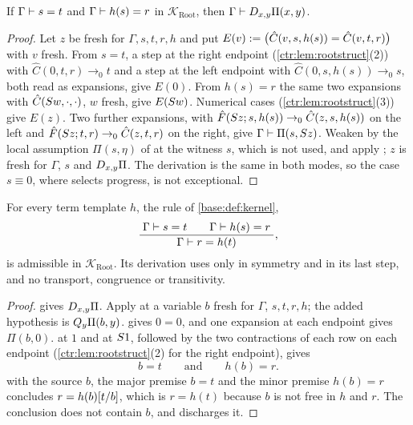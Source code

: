 \begin{lemma}\label{ctr:lem:rootpacket}
If $\Gamma\vdash s=t$ and $\Gamma\vdash h(s)=r$ in $\mathcal K_{\mathrm{Root}}$, then
$\Gamma\vdash D_{x,y}\Pi(x,y)$.
\end{lemma}
\begin{proof}
Let $z$ be fresh for $\Gamma,s,t,r,h$ and put $E(v)\mathrel{:=}\bigl(\hat C(v,s,h(s))=\hat C(v,t,r)\bigr)$
with $v$ fresh. From $s=t$, a step at the right endpoint (\cref{ctr:lem:rootstruct}(2))
with $\hat C(0,t,r)\to_0 t$ and a step at the left endpoint with $\hat C(0,s,h(s))\to_0 s$,
both read as expansions, give $E(0)$. From $h(s)=r$ the same two expansions with
$\hat C(S w,\cdot,\cdot)$, $w$ fresh, give $E(S w)$. Numerical cases
(\cref{ctr:lem:rootstruct}(3)) give $E(z)$. Two further expansions, with
$\hat F(S z;s,h(s))\to_0\hat C(z,s,h(s))$ on the left and
$\hat F(S z;t,r)\to_0\hat C(z,t,r)$ on the right, give $\Gamma\vdash\Pi(s,S z)$.
Weaken by the local assumption $\Pi(s,\eta)$ of  at the witness $s$, which is not
used, and apply ; $z$ is fresh for $\Gamma$, $s$ and $D_{x,y}\Pi$. The
derivation is the same in both modes, so the case $s\equiv 0$, where  selects
progress, is not exceptional.
\end{proof}

\begin{theorem}\label{ctr:thm:roottransport}
For every term template $h$, the rule  of \cref{base:def:kernel},
\[
 \dfrac{\;\Gamma\vdash s=t\qquad\Gamma\vdash h(s)=r\;}{\;\Gamma\vdash r=h(t)\;},
\]
is admissible in $\mathcal K_{\mathrm{Root}}$. Its derivation uses  only in
symmetry and in its last step, and no transport, congruence or transitivity.
\end{theorem}
\begin{proof}
 gives $D_{x,y}\Pi$. Apply  at a variable $b$ fresh
for $\Gamma$, $s,t,r,h$; the added hypothesis is $Q_{y}\Pi(b,y)$.  gives
$0=0$, and one expansion at each endpoint gives $\Pi(b,0)$.  at $1$ and at
$S 1$, followed by the two contractions of each row on each endpoint
(\cref{ctr:lem:rootstruct}(2) for the right endpoint), gives
\[
 b=t\qquad\text{and}\qquad h(b)=r.
\]
 with the source $b$, the major premise $b=t$ and the minor premise $h(b)=r$
concludes $r=h(b)[t/b]$, which is $r=h(t)$ because $b$ is not free in $h$ and $r$. The
conclusion does not contain $b$, and  discharges it.
\end{proof}

